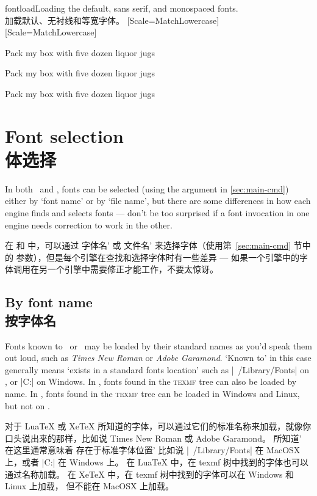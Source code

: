 \documentclass[a4paper]{l3doc}
\begin{document}
\begin{Lexample}{fontload}{Loading the default, sans serif, and monospaced fonts.\\加载默认、无衬线和等宽字体。}
  \setmainfont{texgyrebonum-regular.otf}
  \setsansfont{lmsans10-regular.otf}[Scale=MatchLowercase]
  \setmonofont{Inconsolatazi4-Regular.otf}[Scale=MatchLowercase]

  \rmfamily Pack my box with five dozen liquor jugs\par
  \sffamily Pack my box with five dozen liquor jugs\par
  \ttfamily Pack my box with five dozen liquor jugs
\end{Lexample}

\section{Font selection\\体选择}

In both \LuaTeX\ and \XeTeX, fonts can be selected (using the  argument in \ref{sec:main-cmd}) either by `font name' or by `file name', but there are some differences in how each engine finds and selects fonts --- don't be too surprised if a font invocation in one engine needs correction to work in the other.

在 \LuaTeX 和 \XeTeX 中，可以通过 字体名' 或 文件名’ 来选择字体（使用第~\ref{sec:main-cmd} 节中的  参数），但是每个引擎在查找和选择字体时有一些差异 — 如果一个引擎中的字体调用在另一个引擎中需要修正才能工作，不要太惊讶。

\subsection{By font name\\按字体名}

Fonts known to \LuaTeX\ or \XeTeX\ may be loaded by their standard names as
you'd speak them out loud, such as \emph{Times New Roman} or
\emph{Adobe Garamond}.
`Known to' in this case generally means `exists in a standard fonts location'
such as |~/Library/Fonts| on \MacOSX, or |C:\Windows\Fonts| on Windows.
In \LuaTeX, fonts found in the \textsc{texmf} tree can also be loaded by name.
In \XeTeX, fonts found in the \textsc{texmf} tree can be loaded in Windows and Linux,
but not on \MacOSX.

对于 LuaTeX 或 XeTeX 所知道的字体，可以通过它们的标准名称来加载，就像你口头说出来的那样，比如说 Times New Roman 或 Adobe Garamond。 所知道' 在这里通常意味着 存在于标准字体位置’ 比如说 |~/Library/Fonts| 在 MacOSX 上，或者 |C:\Windows\Fonts| 在 Windows 上。 在 LuaTeX 中，在 texmf 树中找到的字体也可以通过名称加载。 在 XeTeX 中，在 texmf 树中找到的字体可以在 Windows 和 Linux 上加载， 但不能在 MacOSX 上加载。
\end{document}
